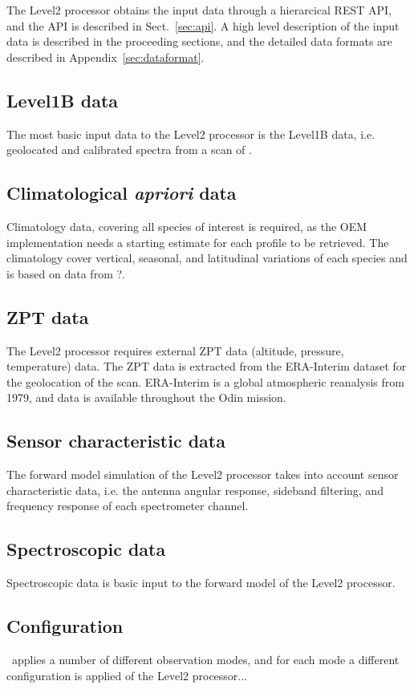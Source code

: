 The Level2 processor obtains the input data through a hierarcical 
REST API, and the API is described in Sect.~\ref{sec:api}.
A high level description of the input data is described 
in the proceeding sections, and the detailed data formats
are described in Appendix~\ref{sec:dataformat}.


\subsection{Level1B data}
The most basic input data to the Level2 processor is the Level1B data,
i.e. geolocated and calibrated spectra from a scan of \smr.

\subsection{Climatological \textit{apriori} data}

Climatology data, covering all species of interest is required, as
the OEM implementation needs a starting estimate for each profile
to be retrieved. The climatology cover vertical, seasonal,
and latitudinal variations of each species and is based on data
from ?.

\subsection{ZPT data}
The Level2 processor requires external ZPT data (altitude, pressure, temperature) 
data. The ZPT data is extracted from the ERA-Interim dataset for the geolocation
of the scan. ERA-Interim is a global atmospheric reanalysis from 1979, and 
data is available throughout the Odin mission. 

\subsection{Sensor characteristic data}
The forward model simulation of the Level2 processor takes into account 
sensor characteristic data, i.e. the antenna angular response, 
sideband filtering, and frequency response of each spectrometer channel. 

\subsection{Spectroscopic data}
Spectroscopic data is basic input to the forward model of the Level2
processor.

\subsection{Configuration}
\smr\ applies a number of different observation modes,
and for each mode a different configuration is applied
of the Level2 processor...


